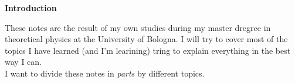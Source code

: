 \begin{flushright}
    \vspace*{4cm}\Huge\bfseries\sffamily \color{mColor} Introduction\\
\end{flushright}
\normalsize\normalfont\vspace*{1cm}
These notes are the result of my own studies during my master dregree in theoretical physics at the University of Bologna. I will try to cover most of the topics I have learned (and I'm learining) tring to explain everything in the best way I can.\\
I want to divide these notes in \emph{parts} by different topics. 
